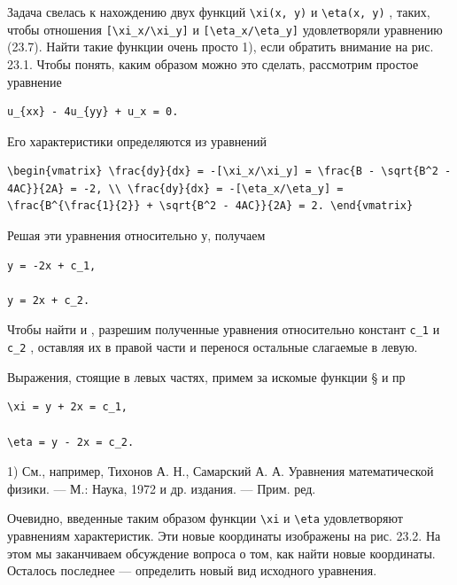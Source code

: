 \documentclass[
  ukrainian,
]{article}
\begin{document}
Задача свелась к нахождению двух функций
\texttt{\textbackslash{}xi(x,\ y)} и \texttt{\textbackslash{}eta(x,\ y)}
, таких, чтобы отношения
\texttt{{[}\textbackslash{}xi\_x/\textbackslash{}xi\_y{]}} и
\texttt{{[}\textbackslash{}eta\_x/\textbackslash{}eta\_y{]}}
удовлетворяли уравнению (23.7). Найти такие функции очень просто 1),
если обратить внимание на рис. 23.1. Чтобы понять, каким образом можно
это сделать, рассмотрим простое уравнение

\begin{verbatim}
u_{xx} - 4u_{yy} + u_x = 0.
\end{verbatim}

Его характеристики определяются из уравнений

\begin{verbatim}
\begin{vmatrix} \frac{dy}{dx} = -[\xi_x/\xi_y] = \frac{B - \sqrt{B^2 - 4AC}}{2A} = -2, \\ \frac{dy}{dx} = -[\eta_x/\eta_y] = \frac{B^{\frac{1}{2}} + \sqrt{B^2 - 4AC}}{2A} = 2. \end{vmatrix}
\end{verbatim}

Решая эти уравнения относительно у, получаем

\begin{verbatim}
y = -2x + c_1,

y = 2x + c_2.
\end{verbatim}

Чтобы найти \xi   и \eta  , разрешим полученные уравнения относительно
констант \texttt{c\_1} и \texttt{c\_2} , оставляя их в правой части и
перенося остальные слагаемые в левую.

Выражения, стоящие в левых частях, примем за искомые функции § и пр

\begin{verbatim}
\xi = y + 2x = c_1,

\eta = y - 2x = c_2.
\end{verbatim}

1) См., например, Тихонов А. Н., Самарский А. А. Уравнения
математической физики. --- М.: Наука, 1972 и др. издания. --- Прим. ред.

Очевидно, введенные таким образом функции \texttt{\textbackslash{}xi} и
\texttt{\textbackslash{}eta} удовлетворяют уравнениям характеристик. Эти
новые координаты изображены на рис. 23.2. На этом мы заканчиваем
обсуждение вопроса о том, как найти новые координаты. Осталось последнее
--- определить новый вид исходного уравнения.
\end{document}
